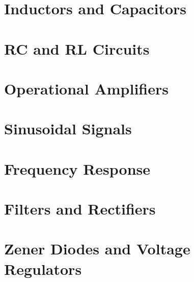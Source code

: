 \documentclass{article}
\begin{document}
\section{Inductors and Capacitors}
\newpage
\section{RC and RL Circuits}
\newpage
\section{Operational Amplifiers}
\newpage
\section{Sinusoidal Signals}
\newpage
\section{Frequency Response}
\newpage
\section{Filters and Rectifiers}
\newpage
\section{Zener Diodes and Voltage Regulators}
\newpage
\end{document}
